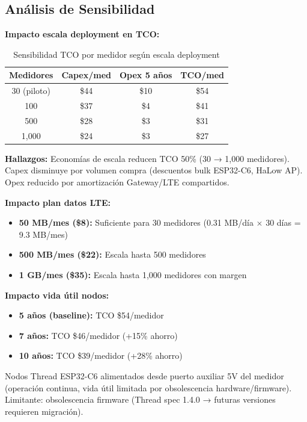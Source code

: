 \subsection{Análisis de Sensibilidad}
\label{sec:res-sensibilidad}

\textbf{Impacto escala deployment en TCO:}

\begin{table}[H]
\centering
\caption{Sensibilidad TCO por medidor según escala deployment}
\label{tab:sensibilidad-escala}
\begin{tabular}{|c|c|c|c|}
\hline
\rowcolor{gray!20}
\textbf{Medidores} & \textbf{Capex/med} & \textbf{Opex 5 años} & \textbf{TCO/med} \\
\hline
30 (piloto) & \$44 & \$10 & \$54 \\
\hline
100 & \$37 & \$4 & \$41 \\
\hline
500 & \$28 & \$3 & \$31 \\
\hline
1,000 & \$24 & \$3 & \$27 \\
\hline
\end{tabular}
\end{table}

\textbf{Hallazgos:} Economías de escala reducen TCO 50\% (30 → 1,000 medidores). Capex disminuye por volumen compra (descuentos bulk ESP32-C6, HaLow AP). Opex reducido por amortización Gateway/LTE compartidos.

\textbf{Impacto plan datos LTE:}

\begin{itemize}
    \item \textbf{50 MB/mes (\$8):} Suficiente para 30 medidores (0.31 MB/día $\times$ 30 días = 9.3 MB/mes)
    \item \textbf{500 MB/mes (\$22):} Escala hasta 500 medidores
    \item \textbf{1 GB/mes (\$35):} Escala hasta 1,000 medidores con margen
\end{itemize}

\textbf{Impacto vida útil nodos:}

\begin{itemize}
    \item \textbf{5 años (baseline):} TCO \$54/medidor
    \item \textbf{7 años:} TCO \$46/medidor (+15\% ahorro)
    \item \textbf{10 años:} TCO \$39/medidor (+28\% ahorro)
\end{itemize}

Nodos Thread ESP32-C6 alimentados desde puerto auxiliar 5V del medidor (operación continua, vida útil limitada por obsolescencia hardware/firmware). Limitante: obsolescencia firmware (Thread spec 1.4.0 → futuras versiones requieren migración).

